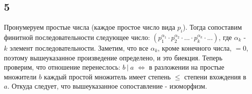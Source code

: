 		\subsection{5}
		Пронумеруем простые числа (каждое простое число вида $p_i$). Тогда сопоставим финитной последовательности следующее число: $(p_1^{\alpha_1} \cdot p_2^{\alpha_2} \cdot ... \cdot p_k^{\alpha_k} \cdot ...)$, где $\alpha_k$ - $k$ элемент последовательности. Заметим, что все $\alpha_k$, кроме конечного числа, $= 0$, поэтому вышеуказанное произведение определено, и это биекция. Теперь проверим, что отношение перенеслось: $b \ | \ a$ $\Leftrightarrow$ в разложении на простые множители $b$ каждый простой множитель имеет степень $\leq$ степени вхождения в $a$.	Откуда следует, что вышеуказанное сопоставление - изоморфизм.
		\\ \\
